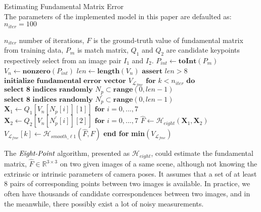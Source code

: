 \documentclass[journal]{IEEEtran}
\begin{document}
\begin{algorithm}[t]
\caption{Estimating Fundamental Matrix Error \protect\\
The parameters of the implemented model in this paper are defaulted as: $n_{iter}=100$}\label{alg:alg1}
\begin{algorithmic}[1]
\REQUIRE $n_{iter}$ number of iterations, $F$ is the ground-truth value of fundamental matrix from training data, $P_m$ is match matrix, $Q_{1}$ and $Q_{2}$ are candidate keypoints respectively select from an image pair $I_{1}$ and $I_{2}$.
\STATE $P_{int} \gets \textbf{toInt}(P_m)$
\STATE $V_{n} \gets \textbf{nonzero}(P_{int})$
\STATE $len \gets \textbf{length}(V_{n})$
\STATE $\textbf{assert } len>8$
\STATE $\textbf{initialize fundamental error vector } V_{\mathcal{L}_{fme}}$
\STATE $\textbf{for } k < n_{iter} \textbf{ do }$
\STATE \hspace{0.5cm}$ \textbf{select 8 indices randomly } N_{p} \subset \textbf{range}(0,len-1)  $
\STATE \hspace{0.5cm}$ \textbf{select 8 indices randomly } N_{p}^{\prime} \subset \textbf{range}(0,len-1)  $
\STATE \hspace{0.5cm}$ \mathbf{X}_{1} \gets Q_{1}[V_{n}[N_{p}[i]][1]] \textbf{ for } i = 0,...,7 $
\STATE \hspace{0.5cm}$ \mathbf{X}_{2} \gets Q_{2}[V_{n}[N_{p}^{\prime}[i]][2]] \textbf{ for } i = 0,...,7 $
\STATE \hspace{0.5cm}$ \hat{F} \gets \mathcal{H}_{eight}(\mathbf{X}_{1}, \mathbf{X}_{2}) $
\STATE \hspace{0.5cm}$ V_{\mathcal{L}_{fme}}[k] \gets \mathcal{H}_{smooth\_\ell 1}(\hat{F}, F) $
\STATE \textbf{end for}
\RETURN \textbf{min}$(V_{\mathcal{L}_{fme}})$
\end{algorithmic}
\label{alg1}
\end{algorithm}

The $\emph{Eight-Point}$ algorithm, presented as $\mathcal{H}_{eight}$, could estimate the fundamental matrix, $\hat{F}\in \mathbb{R}^{3\times 3}$ on two given images of a same scene, although not knowing the extrinsic or intrinsic parameters of camera poses. It assumes that a set of at least 8 pairs of corresponding points between two images is available. In practice, we often have thousands of candidate correspondences between two images, and in the meanwhile, there possibly exist a lot of noisy measurements. 
\end{document}
